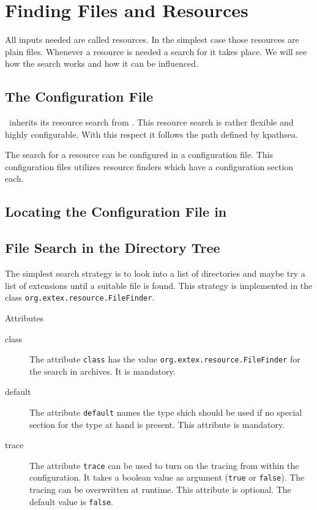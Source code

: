 
\section{Finding Files and Resources}

All inputs needed are called resources. In the simplest case those
resources are plain files. Whenever a resource is needed a search for
it takes place. We will see how the search works and how it can be
influenced.


\subsection{The Configuration File}

\ExBib\ inherits its resource search from \ExTeX{}.
This resource search is rather flexible and highly configurable. With
this respect it follows the path defined by kpathsea.

The search for a resource can be configured in a configuration file.
This configuration files utilizes resource finders which have a
configuration section each.

\INCOMPLETE

\subsection{Locating the Configuration File in \ExBib}


\INCOMPLETE

\subsection{File Search in the Directory Tree}

The simplest search strategy is to look into a list of directories and
maybe try a list of extensions until a suitable file is found. This
strategy is implemented in the class
\texttt{org.extex.resource.FileFinder}.

Attributes
\begin{description}
\item[class] The attribute \texttt{class} has the value
  \texttt{org.extex.resource.FileFinder} for the search in
  archives. It is mandatory.
\item[default] The attribute \texttt{default} names the type shich
  should be used if no special section for the type at hand is
  present. This attribute is mandatory.
\item[trace] The attribute \texttt{trace} can be used to turn on the
  tracing from within the configuration. It takes a boolean value as
  argument (\texttt{true} or \texttt{false}). The tracing can be
  overwritten at runtime. This attribute is optional. The default
  value is \texttt{false}.
\end{description}

